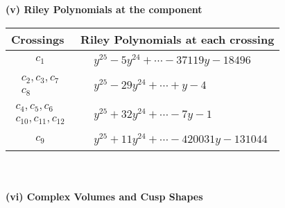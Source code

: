 \documentclass[1p]{elsarticle_modified}
\theoremstyle{definition}
\begin{document}
\newpage\renewcommand{\arraystretch}{1}
\flushleft \textbf{(v) Riley Polynomials at the component}\newline \\
\begin{tabular}{m{50pt}|m{274pt}}
Crossings & \hspace{64pt}Riley Polynomials at each crossing \\
\hline $$\begin{aligned}c_{1}\end{aligned}$$&$\begin{aligned}
&y^{25}-5 y^{24}+\cdots-37119 y-18496
\end{aligned}$\\
\hline $$\begin{aligned}c_{2},c_{3},c_{7}\\c_{8}\end{aligned}$$&$\begin{aligned}
&y^{25}-29 y^{24}+\cdots+y-4
\end{aligned}$\\
\hline $$\begin{aligned}c_{4},c_{5},c_{6}\\c_{10},c_{11},c_{12}\end{aligned}$$&$\begin{aligned}
&y^{25}+32 y^{24}+\cdots-7 y-1
\end{aligned}$\\
\hline $$\begin{aligned}c_{9}\end{aligned}$$&$\begin{aligned}
&y^{25}+11 y^{24}+\cdots-420031 y-131044
\end{aligned}$\\
\hline
\end{tabular}\\~\\
\newpage\flushleft \textbf{(vi) Complex Volumes and Cusp Shapes}
\end{document}
